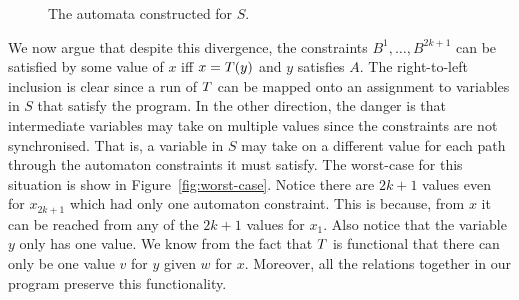 {\begin{figure}
    \caption{\label{fig:aut-constraints} The automata constructed for $S$.}
\end{figure}

We now argue that despite this divergence, the constraints
$B^1, \ldots, B^{2k+1}$
can be satisfied by some value of $x$ iff
$x = T(y)$
and $y$ satisfies $A$.
%
The right-to-left inclusion is clear since a run of $T$ can be mapped
onto an assignment to variables in $S$ that satisfy the program.
%
In the other direction, the danger is that intermediate variables may take on
multiple values since the constraints are not synchronised.
%
That is, a variable in $S$ may take on a different value for each path through
the automaton constraints it must satisfy.
%
The worst-case for this situation is show in Figure~\ref{fig:worst-case}.
%
Notice there are $2k+1$ values even for $x_{2k+1}$ which had only one automaton
constraint.
%
This is because, from $x$ it can be reached from any of the $2k+1$ values for
$x_1$.
%
Also notice that the variable $y$ only has one value.
%
We know from the fact that $T$ is functional that there can only be
one value $v$ for $y$ given $w$ for $x$.
%
Moreover, all the relations together in our program preserve this
functionality.

}
